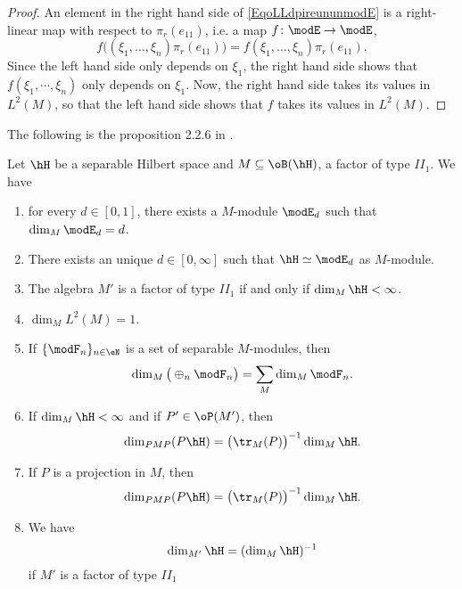 \begin{proof}
An element in the right hand side of \eqref{EqoLLdpireununmodE} is a right-linear map with respect to $\pi_r(e_{11})$, i.e. a map $f\colon \modE\to \modE$,
\begin{equation}
	f\big( (\xi_1,\ldots,\xi_n)\pi_r(e_{11}) \big)=f(\xi_1,\ldots,\xi_n)\pi_r(e_{11}).
\end{equation}
Since the left hand side only depends on $\xi_1$, the right hand side  shows that $f(\xi_1,\cdots,\xi_n)$ only depends on $\xi_1$. Now, the right hand side takes its values in $L^2(M)$, so that the left hand side shows that $f$ takes its values in $L^2(M)$.
\end{proof}

The following is the proposition 2.2.6 in \cite{JonesSunder}.
\begin{proposition}	\label{PropDimIIun}
	Let $\hH$ be a separable Hilbert space and $M\subseteq\oB(\hH)$, a factor of type $II_1$. We have
	\begin{enumerate}

		\item\label{ItemiPropDimIIun} for every $d\in[0,1]$, there exists a $M$-module $\modE_d$ such that $\dim_M\modE_d=d$.
		
		\item\label{ItemiiPropDimIIun} There exists an unique $d\in[0,\infty]$ such that $\hH\simeq\modE_d$ as $M$-module.

		\item\label{ItemiiiPropDimIIun} The algebra $M'$ is a factor of type $II_1$ if and only if $\dim_M\hH<\infty$.

		\item\label{ItemivPropDimIIun} $\dim_M L^2(M)=1$.
 
		\item\label{ItemvPropDimIIun} If $\{ \modF_n \}_{n\in\eN}$ is a set of separable $M$-modules, then
			\begin{equation}
				\dim_M\big( \oplus_n\modF_n \big)=\sum_M\dim_M\modF_n.
			\end{equation}
		\item\label{ItemviPropDimIIun} If $\dim_M\hH<\infty$ and if $P'\in\oP(M')$, then 
			\begin{equation}
				\dim_{PMP}(P\hH)=\big( \tr_M(P) \big)^{-1}\dim_M\hH.				
			\end{equation}
	
		\item\label{ItemviiPropDimIIun} If $P$ is a projection in $M$, then 
			\begin{equation}
				\dim_{PMP}(P\hH)=\big( \tr_M(P) \big)^{-1}\dim_M\hH.
			\end{equation}

		\item\label{ItemviiiPropDimIIun}  We have
		\begin{equation}				\label{EqDimMMprimeprodun}
			\dim_{M'}\hH=(\dim_M\hH)^{-1}
		\end{equation}
		if $M'$ is a factor of type $II_1$
	\end{enumerate}
\end{proposition}

